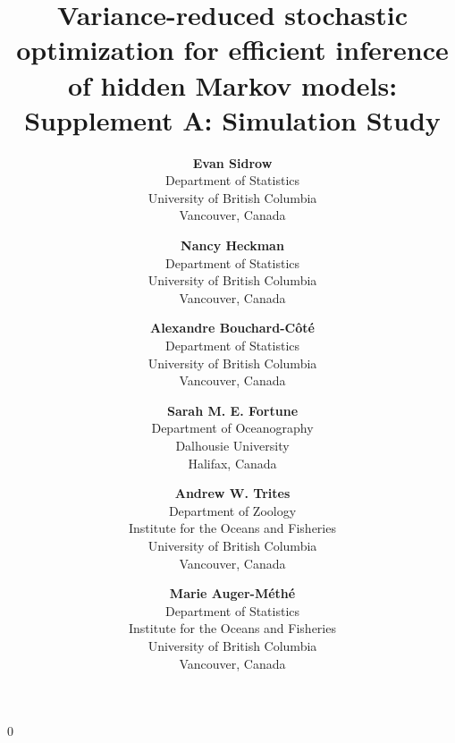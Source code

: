 \documentclass[12pt]{article}
\newcommand{\blind}{0}
\begin{document}
%

\def\spacingset#1{\renewcommand{\baselinestretch}%
{#1}\small\normalsize} \spacingset{1}


\blind
{
    \title{Variance-reduced stochastic optimization for efficient inference of hidden Markov models: Supplement A: Simulation Study}
    
    \author{
      \textbf{Evan Sidrow} \\
      Department of Statistics \\
      University of British Columbia\\
      Vancouver, Canada \\
      \and
      \textbf{Nancy Heckman} \\
      Department of Statistics \\
      University of British Columbia \\
      Vancouver, Canada \\
      \and
      \textbf{Alexandre Bouchard-C\^ot\'e} \\
      Department of Statistics \\
      University of British Columbia \\
      Vancouver, Canada \\
      \and
      \textbf{Sarah M. E. Fortune} \\
      Department of Oceanography \\
      Dalhousie University \\
      Halifax, Canada \\
      \and
      \textbf{Andrew W. Trites} \\
      Department of Zoology \\
      Institute for the Oceans and Fisheries \\
      University of British Columbia \\
      Vancouver, Canada \\
      \and
      \textbf{Marie Auger-M\'eth\'e} \\
      Department of Statistics \\
      Institute for the Oceans and Fisheries \\
      University of British Columbia \\
      Vancouver, Canada \\
    }
    \maketitle
} \fi
\end{document}
